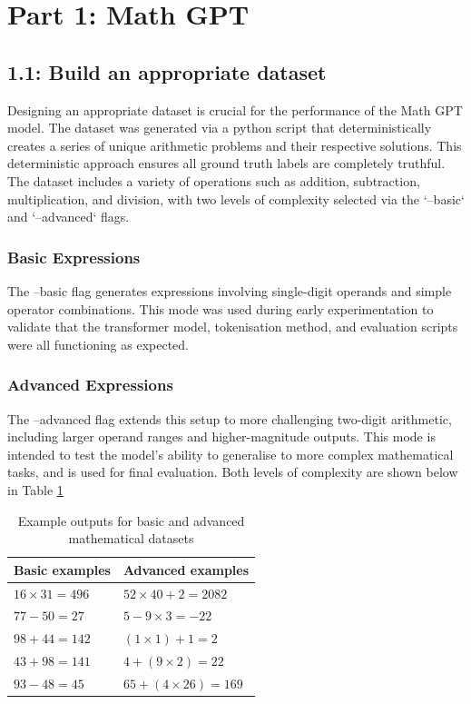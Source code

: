 \section{Part 1: Math GPT}

\subsection{1.1: Build an appropriate dataset}
Designing an appropriate dataset is crucial for the performance of the Math GPT model. The dataset was generated via a python script that deterministically creates a series of unique arithmetic problems and their respective solutions. This deterministic approach ensures all ground truth labels are completely truthful. The dataset includes a variety of operations such as addition, subtraction, multiplication, and division, with two levels of complexity selected via the `--basic` and `--advanced` flags.

\subsubsection{Basic Expressions}
The --basic flag generates expressions involving single-digit operands and simple operator combinations. 
This mode was used during early experimentation to validate that the transformer model, tokenisation method, and evaluation scripts were all functioning as expected.

\subsubsection{Advanced Expressions}
The --advanced flag extends this setup to more challenging two-digit arithmetic, including larger operand ranges and higher-magnitude outputs. This mode is intended to test the model's ability to generalise to more complex mathematical tasks, and is used for final evaluation. Both levels of complexity are shown below in Table \ref{tab:examples}

\begin{table}[h]
\centering
\begin{tabular}{|l|l|}
\hline
\textbf{Basic examples} & \textbf{Advanced examples} \\
\hline
$16 \times 31 = 496$   & $52 \times 40 + 2 = 2082$ \\
$77 - 50 = 27$        & $5 - 9 \times 3 = -22$ \\
$98 + 44 = 142$       & $(1 \times 1) + 1 = 2$ \\
$43 + 98 = 141$       & $4 + (9 \times 2) = 22$ \\
$93 - 48 = 45$        & $65 + (4 \times 26) = 169$ \\
\hline
\end{tabular}
\caption{Example outputs for basic and advanced mathematical datasets}
\label{tab:examples}
\end{table}

